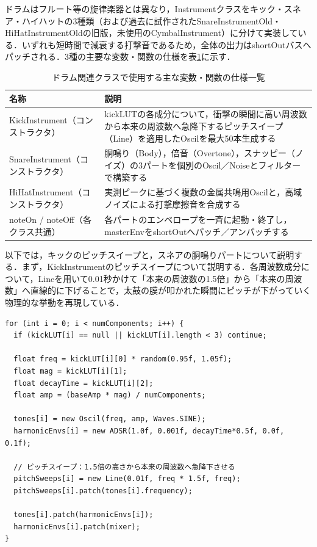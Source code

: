 ドラムはフルート等の旋律楽器とは異なり，Instrumentクラスをキック・スネア・ハイハットの3種類（および過去に試作されたSnareInstrumentOld・HiHatInstrumentOldの旧版，未使用のCymbalInstrument）に分けて実装している．いずれも短時間で減衰する打撃音であるため，全体の出力はshortOutバスへパッチされる．3種の主要な変数・関数の仕様を表\ref{table:gakki_drum}に示す．

\begin{table}[H]
    \caption{ドラム関連クラスで使用する主な変数・関数の仕様一覧}
    \centering
    \label{table:gakki_drum}
    \begin{tabular}{p{4.3cm}p{9.7cm}}
    \hline
    \textbf{名称} & \textbf{説明}\\
    \hline
    KickInstrument（コンストラクタ） & kickLUTの各成分について，衝撃の瞬間に高い周波数から本来の周波数へ急降下するピッチスイープ（Line）を適用したOscilを最大50本生成する\\
    \hline
    SnareInstrument（コンストラクタ） & 胴鳴り（Body），倍音（Overtone），スナッピー（ノイズ）の3パートを個別のOscil／Noiseとフィルターで構築する\\
    \hline
    HiHatInstrument（コンストラクタ） & 実測ピークに基づく複数の金属共鳴用Oscilと，高域ノイズによる打撃摩擦音を合成する\\
    \hline
    noteOn / noteOff（各クラス共通） & 各パートのエンベロープを一斉に起動・終了し，masterEnvをshortOutへパッチ／アンパッチする\\
    \hline
    \end{tabular}
\end{table}

以下では，キックのピッチスイープと，スネアの胴鳴りパートについて説明する．まず，KickInstrumentのピッチスイープについて説明する．各周波数成分について，Lineを用いて0.01秒かけて「本来の周波数の1.5倍」から「本来の周波数」へ直線的に下げることで，太鼓の膜が叩かれた瞬間にピッチが下がっていく物理的な挙動を再現している．

\begin{lstlisting}[caption={KickInstrumentコンストラクタ（ピッチスイープ部分）}, label={lst:gakki_kick}]
for (int i = 0; i < numComponents; i++) {
  if (kickLUT[i] == null || kickLUT[i].length < 3) continue;

  float freq = kickLUT[i][0] * random(0.95f, 1.05f);
  float mag = kickLUT[i][1];
  float decayTime = kickLUT[i][2];
  float amp = (baseAmp * mag) / numComponents;

  tones[i] = new Oscil(freq, amp, Waves.SINE);
  harmonicEnvs[i] = new ADSR(1.0f, 0.001f, decayTime*0.5f, 0.0f, 0.1f);

  // ピッチスイープ：1.5倍の高さから本来の周波数へ急降下させる
  pitchSweeps[i] = new Line(0.01f, freq * 1.5f, freq);
  pitchSweeps[i].patch(tones[i].frequency);

  tones[i].patch(harmonicEnvs[i]);
  harmonicEnvs[i].patch(mixer);
}
\end{lstlisting}

